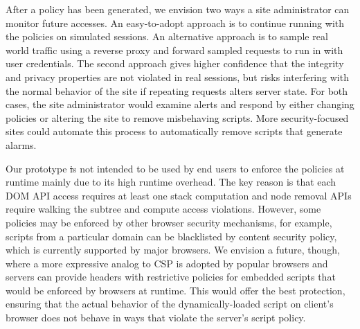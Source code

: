  After a policy has been generated, we
envision two ways a site administrator can monitor future accesses.  An
easy-to-adopt approach is to continue running \st with the policies on
simulated sessions.  An alternative approach is to sample real world
traffic using a reverse proxy and forward sampled requests to run in \st
with user credentials.  The second approach gives higher confidence that
the integrity and privacy properties are not violated in real sessions,
but risks interfering with the normal behavior of the site if repeating
requests alters server state.  For both cases, the site administrator
would examine alerts and respond by either changing policies or altering
the site to remove misbehaving scripts.  More security-focused sites
could automate this process to automatically remove scripts that
generate alarms.

\label{sec:enforcement} Our prototype
\st is not intended to be used by end users to enforce the policies at
runtime mainly due to its high runtime overhead.  The key reason is that
each DOM API access requires at least one stack computation and node
removal APIs require walking the subtree and compute access violations.
However, some policies may be enforced by other browser security
mechanisms, for example, scripts from a particular domain can be
blacklisted by content security policy, which is currently supported by
major browsers.  We envision a future, though, where a more expressive
analog to CSP is adopted by popular browsers and servers can provide
headers with restrictive policies for embedded scripts that would be
enforced by browsers at runtime.  This would offer the best protection,
ensuring that the actual behavior of the dynamically-loaded script on
client's browser does not behave in ways that violate the server's
script policy.
